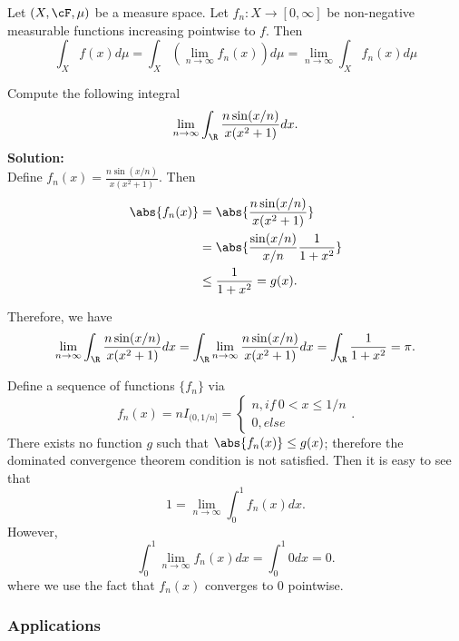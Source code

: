 \begin{refsection}
\begin{theorem}\label{ch:calculus:th:LebesgueDominatedConvergenceTheorem}\cite[27]{cheng2008crash}Let $(X,\cF,\mu)$ be a measure space. Let $f_n: X\to [0,\infty]$ be non-negative measurable functions increasing pointwise to $f$. Then
	$$\int_X f(x) d\mu = \int_X(\lim_{n\to \infty} f_n(x)) d\mu = \lim_{n\to\infty} \int_X f_n(x)d\mu$$
\end{theorem}


\begin{example}
Compute the following integral
$$\lim_{n\to\infty} \int_{\R} \frac{n\sin(x/n)}{x(x^2+1)}dx.$$
\textbf{Solution:}\\
Define $f_n(x)=\frac{n\sin(x/n)}{x(x^2+1)}$. Then
\begin{align*}
\abs{f_n(x)} &= \abs{\frac{n\sin(x/n)}{x(x^2+1)}}\\
& = \abs{\frac{\sin(x/n)}{x/n} \frac{1}{1+x^2}} \\
& \leq \frac{1}{1+x^2} = g(x).
\end{align*}	

Therefore, we have
$$\lim_{n\to\infty} \int_{\R} \frac{n\sin(x/n)}{x(x^2+1)}dx = \int_{\R} \lim_{n\to\infty} \frac{n\sin(x/n)}{x(x^2+1)}dx = \int_{\R} \frac{1}{1+x^2} = \pi.$$
\end{example}



\begin{example}
Define a sequence of functions $\{f_n\}$ via
$$f_n(x) = nI_{(0,1/n]} = \begin{cases*}
n, if~ 0 < x \leq 1/n \\
0, else
\end{cases*}.$$
There exists no function $g$ such that $\abs{f_n(x)}\leq g(x)$; therefore the dominated convergence theorem condition is not satisfied.
Then it is easy to see that
$$1 = \lim_{n\to \infty} \int_0^1 f_n(x)dx.$$
However, 
$$\int_0^1 \lim_{n\to \infty} f_n(x)dx = \int_0^1 0 dx = 0.$$
where we use the fact that $f_n(x)$ converges to 0 pointwise.
\end{example}


\subsubsection{Applications}


\end{refsection}
